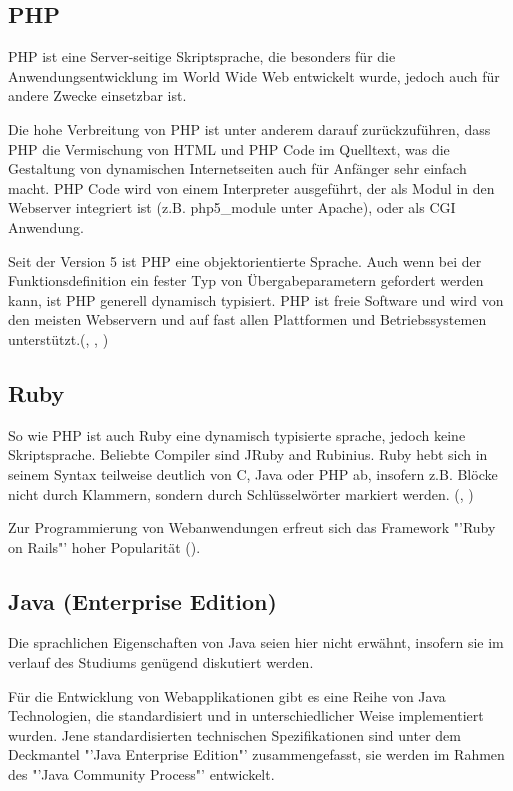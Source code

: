 \documentclass[12pt]{report}
\begin{document}
\subsection{PHP}
PHP ist eine Server-seitige Skriptsprache, die besonders für die Anwendungsentwicklung im World Wide Web entwickelt wurde, jedoch auch für andere Zwecke einsetzbar ist.

Die hohe Verbreitung von PHP ist unter anderem darauf zurückzuführen, dass PHP die Vermischung von HTML und PHP Code im Quelltext, was die Gestaltung von dynamischen Internetseiten auch für Anfänger sehr einfach macht. PHP Code wird von einem Interpreter ausgeführt, der als Modul in den Webserver integriert ist (z.B. php5\_module unter Apache), oder als CGI Anwendung.

Seit der Version 5 ist PHP eine objektorientierte Sprache. Auch wenn bei der Funktionsdefinition ein fester Typ von Übergabeparametern gefordert werden kann, ist PHP generell dynamisch typisiert. PHP ist freie Software und wird von den meisten Webservern und auf fast allen Plattformen und Betriebssystemen unterstützt.(\cite{ebooks:PHP}, \cite{ebooks:PHP2}, \cite{PHPManual})

\subsection{Ruby}
So wie PHP ist auch Ruby eine dynamisch typisierte sprache, jedoch keine Skriptsprache. Beliebte Compiler sind JRuby and Rubinius. Ruby hebt sich in seinem Syntax teilweise deutlich von C, Java oder PHP ab, insofern z.B. Blöcke nicht durch Klammern, sondern durch Schlüsselwörter markiert werden. (\cite{Ruby}, \cite{wiki:Ruby})

Zur Programmierung von Webanwendungen erfreut sich das Framework "'Ruby on Rails"' hoher Popularität (\cite{RubyOnRails}).

\subsection{Java (Enterprise Edition)}
Die sprachlichen Eigenschaften von Java seien hier nicht erwähnt, insofern sie im verlauf des Studiums genügend diskutiert werden.

Für die Entwicklung von Webapplikationen gibt es eine Reihe von Java Technologien, die standardisiert und in unterschiedlicher Weise implementiert wurden. Jene standardisierten technischen Spezifikationen sind unter dem Deckmantel "'Java Enterprise Edition"' \cite{JavaEE} zusammengefasst, sie werden im Rahmen des "'Java Community Process"' \cite{JavaCommunityProcess} entwickelt.
\end{document}
